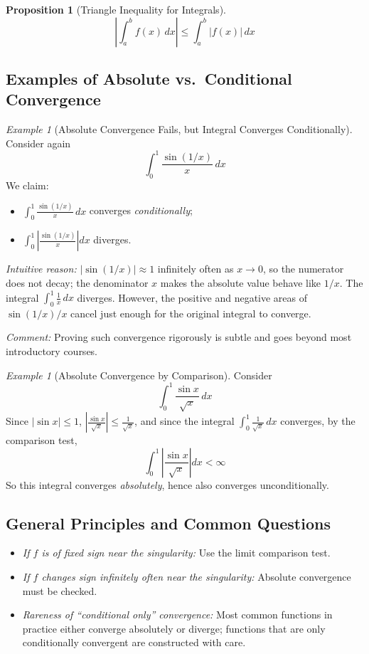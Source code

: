 \documentclass[12pt]{article}
\theoremstyle{definition}
\theoremstyle{plain}
\newtheorem{proposition}[definition]{Proposition}
\theoremstyle{remark}
\newtheorem{example}[definition]{Example}
\begin{document}
\begin{proposition}[Triangle Inequality for Integrals]
\[
\left|\int_a^b f(x)\,dx \right| \leq \int_a^b |f(x)|\,dx
\]
\end{proposition}

\subsection{Examples of Absolute vs.\ Conditional Convergence}

\begin{example}[Absolute Convergence Fails, but Integral Converges Conditionally]
Consider again
\[
\int_0^1 \frac{\sin(1/x)}{x}\,dx
\]
We claim:
\begin{itemize}
    \item $\int_0^1 \frac{\sin(1/x)}{x}\,dx$ converges \emph{conditionally};
    \item $\int_0^1 \left| \frac{\sin(1/x)}{x} \right| dx$ diverges.
\end{itemize}
    
\emph{Intuitive reason:} $|\sin(1/x)| \approx 1$ infinitely often as $x\to0$, so the numerator does not decay; the denominator $x$ makes the absolute value behave like $1/x$. The integral $\int_0^1 \frac{1}{x}\,dx$ diverges. However, the positive and negative areas of $\sin(1/x)/x$ cancel just enough for the original integral to converge.

\emph{Comment:} Proving such convergence rigorously is subtle and goes beyond most introductory courses.
\end{example}

\begin{example}[Absolute Convergence by Comparison]
Consider
\[
\int_0^1 \frac{\sin x}{\sqrt{x}}\,dx
\]
Since $|\sin x| \leq 1$, $\left| \frac{\sin x}{\sqrt{x}} \right| \leq \frac{1}{\sqrt{x}}$, and since the integral $\int_0^1 \frac{1}{\sqrt{x}}\,dx$ converges, by the comparison test,
\[
\int_0^1 \left| \frac{\sin x}{\sqrt{x}} \right| dx < \infty
\]
So this integral converges \emph{absolutely}, hence also converges unconditionally.
\end{example}


\subsection{General Principles and Common Questions}

\begin{itemize}[leftmargin=1.5em]
    \item \emph{If $f$ is of fixed sign near the singularity:} Use the limit comparison test.
    \item \emph{If $f$ changes sign infinitely often near the singularity:} Absolute convergence must be checked.
    \item \emph{Rareness of ``conditional only'' convergence:} Most common functions in practice either converge absolutely or diverge; functions that are only conditionally convergent are constructed with care.
\end{itemize}
\end{document}
